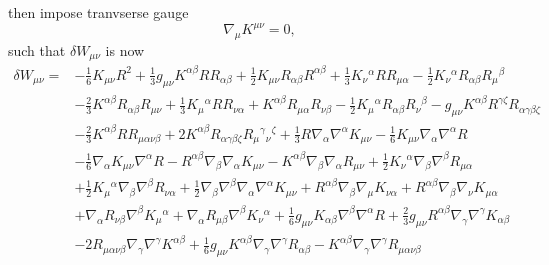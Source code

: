 \documentclass[10pt,letterpaper]{article}
\begin{document}
then impose tranvserse gauge
\begin{equation}
	\nabla_\mu K^{\mu\nu} = 0,
\end{equation}
such that $\delta W_{\mu\nu}$ is now
\begin{align}
\delta W_{\mu\nu}={}&- \tfrac{1}{6} K_{\mu \nu} R^2
 + \tfrac{1}{3} g_{\mu \nu} K^{\alpha \beta} R R_{\alpha \beta}
 + \tfrac{1}{2} K_{\mu \nu} R_{\alpha \beta} R^{\alpha \beta}
 + \tfrac{1}{3} K_{\nu}{}^{\alpha} R R_{\mu \alpha}
 -  \tfrac{1}{2} K_{\nu}{}^{\alpha} R_{\alpha \beta} R_{\mu}{}^{\beta}\nonumber\\
& -  \tfrac{2}{3} K^{\alpha \beta} R_{\alpha \beta} R_{\mu \nu}
 + \tfrac{1}{3} K_{\mu}{}^{\alpha} R R_{\nu \alpha}
 + K^{\alpha \beta} R_{\mu \alpha} R_{\nu \beta}
 -  \tfrac{1}{2} K_{\mu}{}^{\alpha} R_{\alpha \beta} R_{\nu}{}^{\beta}
 -  g_{\mu \nu} K^{\alpha \beta} R^{\gamma \zeta} R_{\alpha \gamma \beta \zeta}\nonumber\\
& -  \tfrac{2}{3} K^{\alpha \beta} R R_{\mu \alpha \nu \beta}
 + 2 K^{\alpha \beta} R_{\alpha \gamma \beta \zeta} R_{\mu}{}^{\gamma}{}_{\nu}{}^{\zeta}
 + \tfrac{1}{3} R \nabla_{\alpha}\nabla^{\alpha}K_{\mu \nu}
 -  \tfrac{1}{6} K_{\mu \nu} \nabla_{\alpha}\nabla^{\alpha}R\nonumber\\
& -  \tfrac{1}{6} \nabla_{\alpha}K_{\mu \nu} \nabla^{\alpha}R
 -  R^{\alpha \beta} \nabla_{\beta}\nabla_{\alpha}K_{\mu \nu}
 -  K^{\alpha \beta} \nabla_{\beta}\nabla_{\alpha}R_{\mu \nu}
 + \tfrac{1}{2} K_{\nu}{}^{\alpha} \nabla_{\beta}\nabla^{\beta}R_{\mu \alpha}\nonumber\\
& + \tfrac{1}{2} K_{\mu}{}^{\alpha} \nabla_{\beta}\nabla^{\beta}R_{\nu \alpha}
 + \tfrac{1}{2} \nabla_{\beta}\nabla^{\beta}\nabla_{\alpha}\nabla^{\alpha}K_{\mu \nu}
 + R^{\alpha \beta} \nabla_{\beta}\nabla_{\mu}K_{\nu \alpha}
 + R^{\alpha \beta} \nabla_{\beta}\nabla_{\nu}K_{\mu \alpha}\nonumber\\
& + \nabla_{\alpha}R_{\nu \beta} \nabla^{\beta}K_{\mu}{}^{\alpha}
 + \nabla_{\alpha}R_{\mu \beta} \nabla^{\beta}K_{\nu}{}^{\alpha}
 + \tfrac{1}{6} g_{\mu \nu} K_{\alpha \beta} \nabla^{\beta}\nabla^{\alpha}R
 + \tfrac{2}{3} g_{\mu \nu} R^{\alpha \beta} \nabla_{\gamma}\nabla^{\gamma}K_{\alpha \beta}\nonumber\\
& - 2 R_{\mu \alpha \nu \beta} \nabla_{\gamma}\nabla^{\gamma}K^{\alpha \beta}
 + \tfrac{1}{6} g_{\mu \nu} K^{\alpha \beta} \nabla_{\gamma}\nabla^{\gamma}R_{\alpha \beta}
 -  K^{\alpha \beta} \nabla_{\gamma}\nabla^{\gamma}R_{\mu \alpha \nu \beta}\nonumber\\

\end{align}
\end{document}
